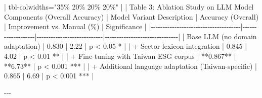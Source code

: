 \documentclass[
  12pt,
]{article}
\newenvironment{Shaded}{\begin{snugshade}}{\end{snugshade}}
\newcommand{\NormalTok}[1]{\textcolor[rgb]{0.00,0.23,0.31}{#1}}
\newcommand{\PreprocessorTok}[1]{\textcolor[rgb]{0.68,0.00,0.00}{#1}}
\begin{document}
\begin{Shaded}
\begin{Highlighting}[]
\PreprocessorTok{|}\NormalTok{ tbl{-}colwidths="35\% 20\% 20\% 20\%" }\PreprocessorTok{|}
\PreprocessorTok{|}\NormalTok{ Table 3: Ablation Study on LLM Model Components (Overall Accuracy)  }
\PreprocessorTok{|}\NormalTok{ Model Variant Description              }\PreprocessorTok{|}\NormalTok{ Accuracy (Overall) }\PreprocessorTok{|}\NormalTok{ Improvement vs. Manual (\%) }\PreprocessorTok{|}\NormalTok{ Significance                   }\PreprocessorTok{|}
\PreprocessorTok{|{-}{-}{-}{-}{-}{-}{-}{-}{-}{-}{-}{-}{-}{-}{-}{-}{-}{-}{-}{-}{-}{-}{-}{-}{-}{-}{-}{-}{-}{-}{-}{-}{-}{-}{-}{-}{-}{-}|{-}{-}{-}{-}{-}{-}{-}{-}{-}{-}{-}{-}{-}{-}{-}{-}{-}{-}{-}|{-}{-}{-}{-}{-}{-}{-}{-}{-}{-}{-}{-}{-}{-}{-}{-}{-}{-}{-}{-}{-}{-}{-}{-}{-}{-}{-}{-}|{-}{-}{-}{-}{-}{-}{-}{-}{-}{-}{-}{-}{-}{-}{-}{-}{-}{-}{-}{-}{-}{-}{-}{-}{-}{-}{-}{-}{-}{-}{-}|}
\PreprocessorTok{|}\NormalTok{ Base LLM (no domain adaptation)      }\PreprocessorTok{|}\NormalTok{ 0.830             }\PreprocessorTok{|}\NormalTok{ 2.22                       }\PreprocessorTok{|}\NormalTok{ p \textless{} 0.05 *                    }\PreprocessorTok{|}
\PreprocessorTok{|}\NormalTok{ + Sector lexicon integration          }\PreprocessorTok{|}\NormalTok{ 0.845             }\PreprocessorTok{|}\NormalTok{ 4.02                       }\PreprocessorTok{|}\NormalTok{ p \textless{} 0.01 **                   }\PreprocessorTok{|}
\PreprocessorTok{|}\NormalTok{ + Fine{-}tuning with Taiwan ESG corpus  }\PreprocessorTok{|}\NormalTok{ **0.867**         | **6.73**                   }\PreprocessorTok{|}\NormalTok{ p \textless{} 0.001 ***                 }\PreprocessorTok{|}
\PreprocessorTok{|}\NormalTok{ + Additional language adaptation (Taiwan{-}specific) }\PreprocessorTok{|}\NormalTok{ 0.865             }\PreprocessorTok{|}\NormalTok{ 6.69                       }\PreprocessorTok{|}\NormalTok{ p \textless{} 0.001 ***                 }\PreprocessorTok{|}

\NormalTok{{-}{-}{-}}


\end{Highlighting}
\end{Shaded}
\end{document}
